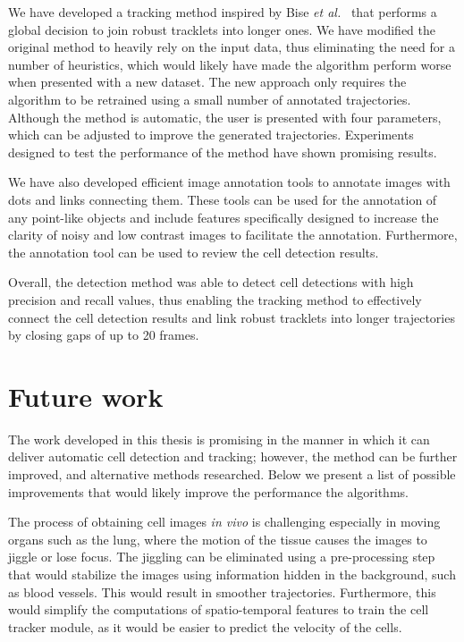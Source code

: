 We have developed a tracking method inspired by Bise \emph{et al.}~\cite{bise11global} that performs a global decision to join robust tracklets into longer ones. We have modified the original method to heavily rely on the input data, thus eliminating the need for a number of heuristics, which would likely have made the algorithm perform worse when presented with a new dataset. The new approach only requires the algorithm to be retrained using a small number of annotated trajectories. Although the method is automatic, the user is presented with four parameters, which can be adjusted to improve the generated trajectories. Experiments designed to test the performance of the method have shown promising results.

We have also developed efficient image annotation tools to annotate images with dots and links connecting them. These tools can be used for the annotation of any point-like objects and include features specifically designed to increase the clarity of noisy and low contrast images to facilitate the annotation. Furthermore, the annotation tool can be used to review the cell detection results.

Overall, the detection method was able to detect cell detections with high precision and recall values, thus enabling the tracking method to effectively connect the cell detection results and link robust tracklets into longer trajectories by closing gaps of up to 20 frames.

\section{Future work}
\label{sec:conclusion_futurework}

The work developed in this thesis is promising in the manner in which it can deliver automatic cell detection and tracking; however, the method can be further improved, and alternative methods researched. Below we present a list of possible improvements that would likely improve the performance the algorithms.

The process of obtaining cell images \textit{in vivo} is challenging especially in moving organs such as the lung, where the motion of the tissue causes the images to jiggle or lose focus. The jiggling can be eliminated using a pre-processing step that would stabilize the images using information hidden in the background, such as blood vessels. This would result in smoother trajectories. Furthermore, this would simplify the computations of spatio-temporal features to train the cell tracker module, as it would be easier to predict the velocity of the cells.

